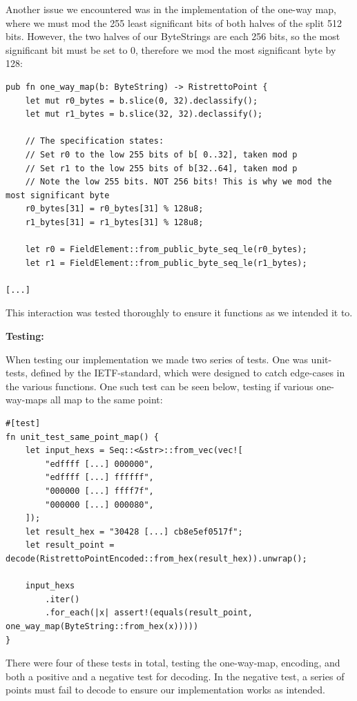 \documentclass{article}
\begin{document}
Another issue we encountered was in the implementation of the one-way
map, where we must mod the 255 least significant bits of both halves
of the split 512 bits. However, the two halves of our ByteStrings are
each 256 bits, so the most significant bit must be set to 0, therefore
we mod the most significant byte by 128:

\begin{lstlisting}
pub fn one_way_map(b: ByteString) -> RistrettoPoint {
	let mut r0_bytes = b.slice(0, 32).declassify();
	let mut r1_bytes = b.slice(32, 32).declassify();

	// The specification states:
	// Set r0 to the low 255 bits of b[ 0..32], taken mod p
	// Set r1 to the low 255 bits of b[32..64], taken mod p
	// Note the low 255 bits. NOT 256 bits! This is why we mod the most significant byte
	r0_bytes[31] = r0_bytes[31] % 128u8;
	r1_bytes[31] = r1_bytes[31] % 128u8;

	let r0 = FieldElement::from_public_byte_seq_le(r0_bytes);
	let r1 = FieldElement::from_public_byte_seq_le(r1_bytes);

[...]
\end{lstlisting}

This interaction was tested thoroughly to ensure it functions as we 
intended it to.

\textbf{Testing:}

When testing our implementation we made two series of tests. 
One was unit-tests, defined by the IETF-standard, which were designed 
to catch edge-cases in the various functions. One such test can be 
seen below, testing if various one-way-maps all map to the same point:

\begin{lstlisting}
#[test]
fn unit_test_same_point_map() {
	let input_hexs = Seq::<&str>::from_vec(vec![
		"edffff [...] 000000",
		"edffff [...] ffffff",
		"000000 [...] ffff7f",
		"000000 [...] 000080",
	]);
	let result_hex = "30428 [...] cb8e5ef0517f";
	let result_point = decode(RistrettoPointEncoded::from_hex(result_hex)).unwrap();

	input_hexs
		.iter()
		.for_each(|x| assert!(equals(result_point, one_way_map(ByteString::from_hex(x)))))
}
\end{lstlisting}

There were four of these tests in total, testing the one-way-map,
encoding, and both a positive and a negative test for decoding. In the
negative test, a series of points must fail to decode to ensure our
implementation works as intended.
\end{document}
